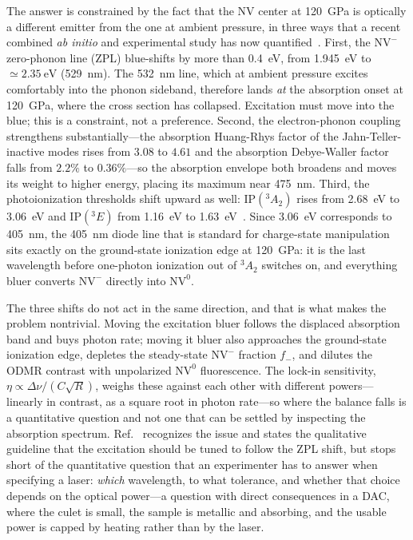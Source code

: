 \documentclass[preprint,12pt]{elsarticle}
\newcommand{\NVm}{\ensuremath{\mathrm{NV}^{-}}}
\newcommand{\NVz}{\ensuremath{\mathrm{NV}^{0}}}
\newcommand{\gsA}{\ensuremath{^{3}\!A_{2}}}
\newcommand{\esE}{\ensuremath{^{3}\!E}}
\newcommand{\fm}{\ensuremath{f_{-}}}
\begin{document}
The answer is constrained by the fact that the NV center at
\SI{120}{\giga\pascal} is optically a different emitter from the one at ambient
pressure, in three ways that a recent combined \emph{ab initio} and experimental
study has now quantified~\cite{Ho2026}. First, the \NVm{} zero-phonon line (ZPL)
blue-shifts by more than \SI{0.4}{\electronvolt}, from \SI{1.945}{\electronvolt}
to $\simeq\SI{2.35}{\electronvolt}$ (\SI{529}{\nano\meter}). The
\SI{532}{\nano\meter} line, which at ambient pressure excites comfortably into the
phonon sideband, therefore lands \emph{at} the absorption onset at
\SI{120}{\giga\pascal}, where the cross section has collapsed. Excitation must
move into the blue; this is a constraint, not a preference. Second, the
electron-phonon coupling strengthens substantially---the absorption Huang-Rhys
factor of the Jahn-Teller-inactive modes rises from $3.08$ to $4.61$ and the
absorption Debye-Waller factor falls from $2.2\%$ to $0.36\%$---so the absorption
envelope both broadens and moves its weight to higher energy, placing its
maximum near \SI{475}{\nano\meter}. Third, the photoionization thresholds shift
upward as well: $\mathrm{IP}(\gsA)$ rises from \SI{2.68}{\electronvolt} to
\SI{3.06}{\electronvolt} and $\mathrm{IP}(\esE)$ from \SI{1.16}{\electronvolt} to
\SI{1.63}{\electronvolt}~\cite{Ho2026,Razinkovas2021}. Since
\SI{3.06}{\electronvolt} corresponds to \SI{405}{\nano\meter}, the
\SI{405}{\nano\meter} diode line that is standard for charge-state manipulation
sits exactly on the ground-state ionization edge at \SI{120}{\giga\pascal}: it is
the last wavelength before one-photon ionization out of \gsA{} switches on, and
everything bluer converts \NVm{} directly into \NVz{}.

The three shifts do not act in the same direction, and that is what makes the
problem nontrivial. Moving the excitation bluer follows the displaced absorption
band and buys photon rate; moving it bluer also approaches the ground-state
ionization edge, depletes the steady-state \NVm{} fraction $\fm$, and dilutes the
ODMR contrast with unpolarized \NVz{} fluorescence. The lock-in sensitivity,
$\eta \propto \Delta\nu/(C\sqrt{R})$, weighs these against each other with
different powers---linearly in contrast, as a square root in photon rate---so
where the balance falls is a quantitative question and not one that can be
settled by inspecting the absorption spectrum. Ref.~\cite{Ho2026} recognizes
the issue and states the qualitative guideline that the excitation should be
tuned to follow the ZPL shift, but stops short of the quantitative question that
an experimenter has to answer when specifying a laser: \emph{which} wavelength,
to what tolerance, and whether that choice depends on the optical power---a
question with direct consequences in a DAC, where the culet is small, the sample
is metallic and absorbing, and the usable power is capped by heating rather than
by the laser.
\end{document}
